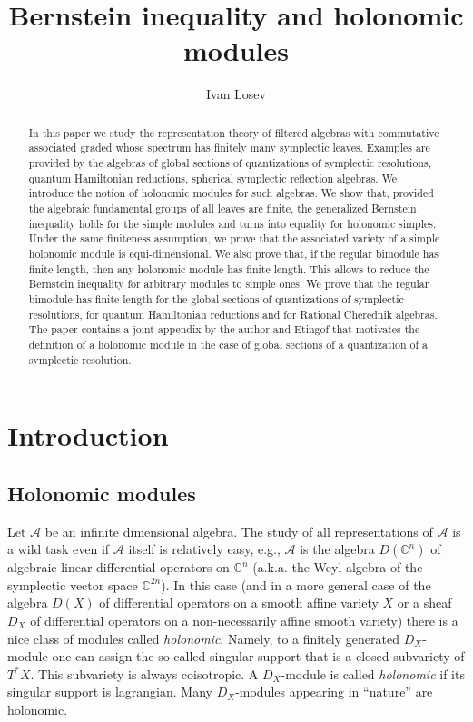 \documentclass[12pt]{amsart}
\title{Bernstein inequality and holonomic modules}
\author{Ivan Losev}
\newcommand{\A}{\mathcal{A}}
\newcommand{\C}{\mathbb{C}}
\theoremstyle{definition}
\begin{document}
\begin{abstract}
In this paper we study the representation theory of filtered algebras with
commutative associated graded whose spectrum has finitely many symplectic leaves. 
Examples are provided by the algebras of global sections of quantizations of symplectic
resolutions, quantum Hamiltonian reductions, spherical symplectic reflection algebras. 
We introduce the notion of holonomic modules for such algebras. We show that,
provided the algebraic fundamental groups of all leaves are finite, the 
generalized Bernstein inequality holds for the simple modules and turns into equality 
for holonomic simples. Under the same finiteness assumption, we prove that
the associated variety of a simple holonomic module is equi-dimensional.
We also prove that, if the regular bimodule has finite length,
then any holonomic module has finite length. This allows to reduce
the Bernstein inequality for arbitrary modules to simple ones.
We prove that the regular bimodule has finite length for the global
sections of quantizations of symplectic resolutions, for quantum Hamiltonian
reductions and for Rational Cherednik algebras.  The paper contains a joint appendix
by the author and Etingof that motivates the definition of a holonomic module 
in the case of global sections of a quantization of a symplectic resolution.
\end{abstract}
\maketitle
\section{Introduction}
\subsection{Holonomic modules}
Let $\A$ be an  infinite dimensional algebra. The study of all representations of $\A$ is a wild task even
if $\A$ itself is relatively easy, e.g., $\A$ is the algebra $D(\C^n)$ of algebraic linear differential
operators on $\C^{n}$ (a.k.a. the Weyl algebra of  the symplectic vector space $\C^{2n}$). In this case
(and in a more general case of the algebra $D(X)$ of differential operators on a smooth affine variety
$X$ or a sheaf $D_X$ of differential operators on a non-necessarily affine smooth variety) there is a nice
class of modules called {\it holonomic}. Namely, to a finitely generated $D_X$-module one can assign the so called
singular support that is a closed subvariety of $T^*X$. This subvariety is always coisotropic.
A $D_X$-module is called {\it holonomic} if its singular support is lagrangian. Many $D_X$-modules
appearing in ``nature'' are holonomic.
\end{document}
